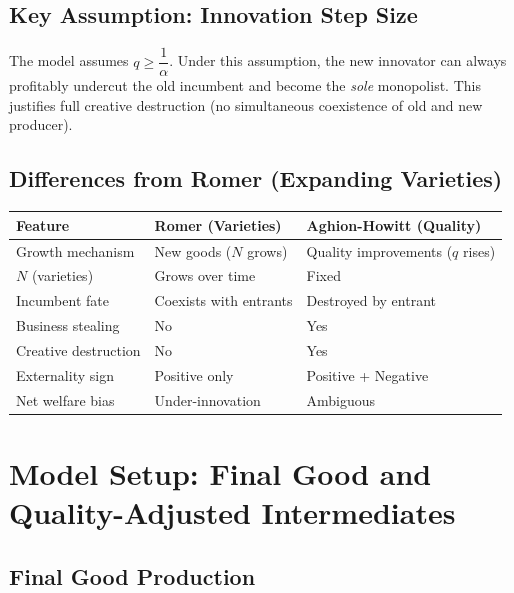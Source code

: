 \documentclass[a4paper,11pt]{article}
\begin{document}
\subsection*{Key Assumption: Innovation Step Size}
\begin{tcolorbox}[colback=orange!10,colframe=orange3,title=Critical Assumption]
The model assumes $q \geq \dfrac{1}{\alpha}$. Under this assumption, the new innovator can always
profitably undercut the old incumbent and become the \emph{sole} monopolist. This justifies
full creative destruction (no simultaneous coexistence of old and new producer).
\end{tcolorbox}

\subsection*{Differences from Romer (Expanding Varieties)}
\begin{center}
\begin{tabular}{lll}
\toprule
\textbf{Feature} & \textbf{Romer (Varieties)} & \textbf{Aghion-Howitt (Quality)} \\
\midrule
Growth mechanism & New goods ($N$ grows) & Quality improvements ($q$ rises) \\
$N$ (varieties) & Grows over time & Fixed \\
Incumbent fate & Coexists with entrants & Destroyed by entrant \\
Business stealing & No & Yes \\
Creative destruction & No & Yes \\
Externality sign & Positive only & Positive + Negative \\
Net welfare bias & Under-innovation & Ambiguous \\
\bottomrule
\end{tabular}
\end{center}

\clearpage

\section{Model Setup: Final Good and Quality-Adjusted Intermediates}

\subsection*{Final Good Production}
\end{document}
